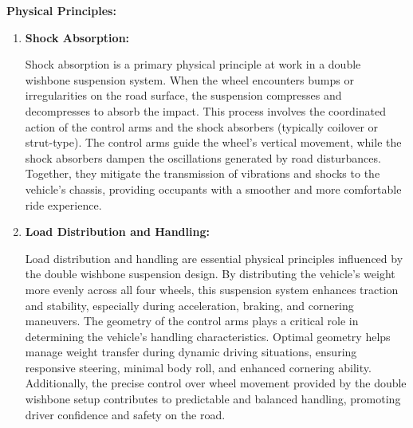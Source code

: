 \textbf{Physical Principles:}

\begin{enumerate}
    \item \textbf{Shock Absorption:}
    
    Shock absorption is a primary physical principle at work in a double wishbone suspension system. When the wheel encounters bumps or irregularities on the road surface, the suspension compresses and decompresses to absorb the impact. This process involves the coordinated action of the control arms and the shock absorbers (typically coilover or strut-type). The control arms guide the wheel's vertical movement, while the shock absorbers dampen the oscillations generated by road disturbances. Together, they mitigate the transmission of vibrations and shocks to the vehicle's chassis, providing occupants with a smoother and more comfortable ride experience.
    
    \item \textbf{Load Distribution and Handling:}
    
    Load distribution and handling are essential physical principles influenced by the double wishbone suspension design. By distributing the vehicle's weight more evenly across all four wheels, this suspension system enhances traction and stability, especially during acceleration, braking, and cornering maneuvers. The geometry of the control arms plays a critical role in determining the vehicle's handling characteristics. Optimal geometry helps manage weight transfer during dynamic driving situations, ensuring responsive steering, minimal body roll, and enhanced cornering ability. Additionally, the precise control over wheel movement provided by the double wishbone setup contributes to predictable and balanced handling, promoting driver confidence and safety on the road.
\end{enumerate}

\newpage
